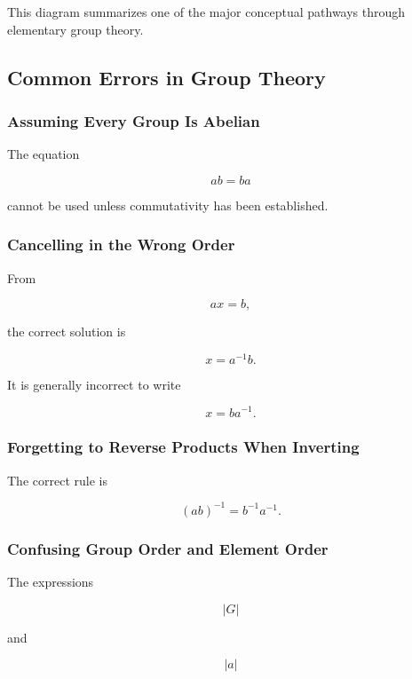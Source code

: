 This diagram summarizes one of the major conceptual pathways through elementary
group theory.

\subsection{Common Errors in Group Theory}
\label{subsec:common-group-errors}

\subsubsection{Assuming Every Group Is Abelian}

The equation

\[ ab=ba \]

cannot be used unless commutativity has been established.

\subsubsection{Cancelling in the Wrong Order}

From

\[ ax=b, \]

the correct solution is

\[ x=a^{-1}b. \]

It is generally incorrect to write

\[ x=ba^{-1}. \]

\subsubsection{Forgetting to Reverse Products When Inverting}

The correct rule is

\[ (ab)^{-1}=b^{-1}a^{-1}. \]

\subsubsection{Confusing Group Order and Element Order}

The expressions

\[ |G| \]

and

\[ |a| \]

